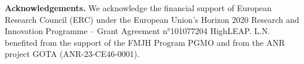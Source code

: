\documentclass[leqno, 11pt, a4paper]{amsart}
\theoremstyle{definition}
\begin{document}
\bigskip

{\bfseries Acknowledgements.} We acknowledge the financial support of European Research Council (ERC) under the European Union’s
Horizon 2020 Research and Innovation Programme – Grant Agreement n°101077204 HighLEAP. L.N. benefited from the support of the FMJH Program PGMO and from the ANR project GOTA (ANR-23-CE46-0001).

\printbibliography
\end{document}
